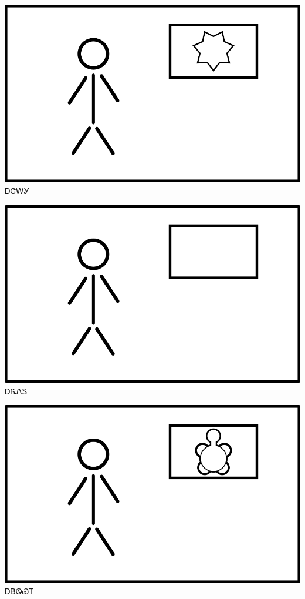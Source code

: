 \documentclass[avery5371]{flashcards}%
\begin{document}
    \begin{flashcard}{
        \includegraphics[width=0.95\columnwidth,height=.51\columnwidth,keepaspectratio]{../artwork/flags/ajalagi-flag}
    }
        \Huge ᎠᏣᎳᎩ
    \end{flashcard}

    \begin{flashcard}{
        \includegraphics[width=0.95\columnwidth,height=.51\columnwidth,keepaspectratio]{../artwork/flags/ayonega-flag}
    }
        \Huge ᎠᏲᏁᎦ
    \end{flashcard}

    \begin{flashcard}{
        \includegraphics[width=0.95\columnwidth,height=.51\columnwidth,keepaspectratio]{../artwork/flags/adaksi-flag}
    }
        \Huge ᎠᏴᏫᏯᎢ
    \end{flashcard}
\end{document}
